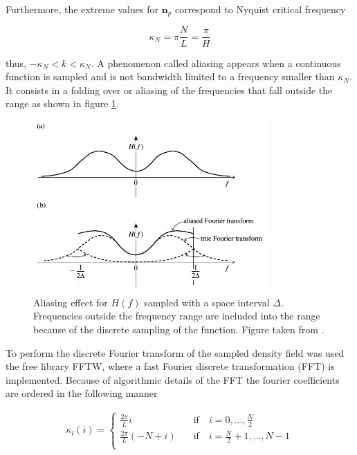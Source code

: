 Furthermore, the extreme values for $\boldsymbol{n}_p$ correspond to Nyquist critical 
frequency 

\[\kappa_N = \pi\frac{N}{L} = \frac{\pi}{H} \]

thus, $-\kappa_N < k < \kappa_N $. A phenomenon called aliasing appears when a continuous 
function is sampled and is not bandwidth limited to a frequency smaller than $\kappa_N$. 
It consists in a folding over or aliasing of the frequencies that fall outside the range
as shown in figure \ref{alias}. 

\begin{figure}[htbp]
       \centering
               \includegraphics[width=0.8\textwidth]{Images/chapter3/aliasing.png}
       \caption{\small Aliasing effect for $H(f)$ sampled with a space interval $\Delta$.
       Frequencies outside the frequency range are included into the range because
       of the discrete sampling of the function. Figure taken from \cite{Press}.}
       \label{alias}
 \end{figure}

To perform the discrete Fourier transform of the sampled density field was used the free 
library FFTW, where a fast Fourier discrete transformation (FFT) is implemented.
Because of algorithmic details of the FFT the fourier coefficients are ordered in the
following manner

\begin{eqnarray*}
\kappa_l(i) =\left\{ \begin{array}{cl}
\frac{2\pi}{L}i \hspace{1em} & \mathrm{if} \hspace{1em} i = 0,\dots ,\frac{N}{2}\\
\frac{2\pi}{L}(-N+i) \hspace{1em} & \mathrm{if} \hspace{1em} i = \frac{N}{2}+1,\dots ,N-1\\
\end{array}\right.
\end{eqnarray*} 


